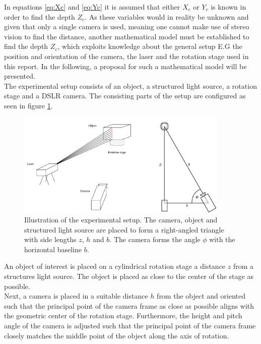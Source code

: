 In equations \ref{eq:Xc} and \ref{eq:Yc} it is assumed that either $X_{c}$ or $Y_{c}$ is known in order to find the depth $Z_{c}$. As these variables would in reality be unknown and given that only a single camera is used, meaning one cannot make use of stereo vision to find the distance, another mathematical model must be established to find the depth $Z_{c}$, which exploits knowledge about the general setup E.G the position and orientation of the camera, the laser and the rotation stage used in this report. In the following, a proposal for such a mathematical model will be presented.\\   

The experimental setup consists of an object, a structured light source, a rotation stage and a DSLR camera. The consisting parts of the setup are configured as seen in figure \ref{fig:setup1}.

\begin{figure}[h]
    \centering
    \includegraphics[width=0.9\textwidth]{figures/reconstruction/setup_2.pdf}
    \caption{Illustration of the experimental setup. The camera, object and structured light source are placed to form a right-angled triangle with side lengths $z$, $h$ and $b$. The camera forms the angle $\phi$ with the horizontal baseline $b$.}
    \label{fig:setup1}
\end{figure}

An object of interest is placed on a cylindrical rotation stage a distance $z$ from a structures light source. The object is placed as close to the center of the stage as possible.\\

Next, a camera is placed in a suitable distance $h$ from the object and oriented such that the principal point of the camera frame as close as possible aligns with the geometric center of the rotation stage. Furthermore, the height and pitch angle of the camera is adjusted such that the principal point of the camera frame closely matches the middle point of the object along the axis of rotation.\\

